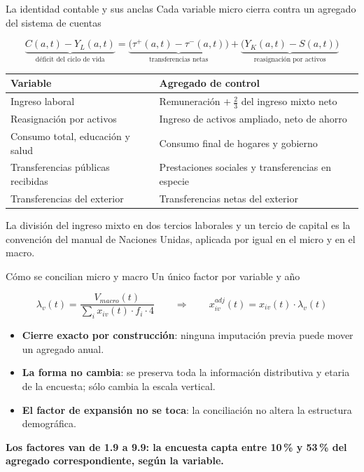 \documentclass[aspectratio=169,11pt]{beamer}
\newcommand{\bajada}[1]{{\small\textcolor{gris}{#1}}\vspace{0.5em}}
\newcommand{\cierre}[1]{%
  \vfill{\small\textcolor{acento}{\textbf{#1}}}}
\begin{document}
\begin{frame}{La identidad contable y sus anclas}
\bajada{Cada variable micro cierra contra un agregado del sistema de cuentas}

\[
\underbrace{C(a,t) - Y_L(a,t)}_{\text{déficit del ciclo de vida}}
=
\underbrace{\big(\tau^{+}(a,t) - \tau^{-}(a,t)\big)}_{\text{transferencias netas}}
+ \underbrace{\big(Y_K(a,t) - S(a,t)\big)}_{\text{reasignación por activos}}
\]

\vspace{0.3em}
\begin{center}\small
\begin{tabular}{ll}
\toprule
Variable & Agregado de control \\
\midrule
Ingreso laboral & Remuneración $+\ \tfrac{2}{3}$ del ingreso mixto neto \\
Reasignación por activos & Ingreso de activos ampliado, neto de ahorro \\
Consumo total, educación y salud & Consumo final de hogares y gobierno \\
Transferencias públicas recibidas & Prestaciones sociales y transferencias en especie \\
Transferencias del exterior & Transferencias netas del exterior \\
\bottomrule
\end{tabular}
\end{center}

\vspace{0.4em}
{\footnotesize La división del ingreso mixto en dos tercios laborales y un tercio de capital es la
convención del manual de Naciones Unidas, aplicada por igual en el micro y en el macro.}
\end{frame}

\begin{frame}{Cómo se concilian micro y macro}
\bajada{Un único factor por variable y año}

\[
\lambda_v(t) = \frac{V_{macro}(t)}{\sum_i x_{iv}(t)\cdot f_i \cdot 4}
\qquad\Longrightarrow\qquad
x^{adj}_{iv}(t) = x_{iv}(t)\cdot\lambda_v(t)
\]

\begin{itemize}\itemsep0.5em
  \item \textbf{Cierre exacto por construcción}: ninguna imputación previa puede mover un agregado
        anual.
  \item \textbf{La forma no cambia}: se preserva toda la información distributiva y etaria de la
        encuesta; sólo cambia la escala vertical.
  \item \textbf{El factor de expansión no se toca}: la conciliación no altera la estructura
        demográfica.
\end{itemize}

\cierre{Los factores van de 1.9 a 9.9: la encuesta capta entre 10\,\% y 53\,\% del agregado
correspondiente, según la variable.}
\end{frame}
\end{document}
